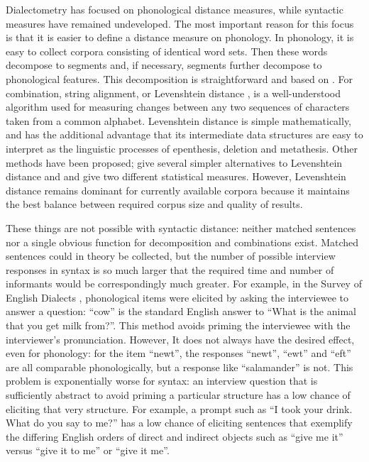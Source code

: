 Dialectometry has focused on phonological distance measures, while
syntactic measures have remained undeveloped. The most important
reason for this focus is that it is easier to define a distance
measure on phonology. In phonology, it is easy to collect corpora
consisting of identical word sets. Then these words decompose to segments and,
if necessary, segments further decompose to phonological
features. This decomposition is straightforward and based on
. For combination, string alignment, or Levenshtein
distance \cite{lev65}, is a well-understood algorithm used for
measuring changes between any two sequences of characters taken from a
common alphabet. Levenshtein distance is simple mathematically, and
has the additional advantage that its intermediate data structures are
easy to interpret as the linguistic processes of epenthesis, deletion and
metathesis. Other methods have been proposed; 
give several simpler alternatives to Levenshtein distance and
 and  give two different
statistical measures. However, Levenshtein distance remains dominant
for currently available corpora because it maintains the best balance
between required corpus size and quality of results.

These things are not possible with syntactic distance: neither matched
sentences nor a single obvious function for decomposition and
combinations exist. Matched sentences could in theory be collected, but the
number of possible interview responses in syntax is so much larger
that the required time and number of informants would be
correspondingly much greater. For example, in the Survey of English
Dialects \cite{orton63}, phonological items were elicited by asking
the interviewee to answer a question: ``cow'' is the standard English
answer to ``What is the animal that you get milk from?''. This method
avoids priming the interviewee with the interviewer's
pronunciation. However, It does not always have the desired effect,
even for phonology: for the item ``newt'', the responses ``newt'',
``ewt'' and ``eft'' are all comparable phonologically, but a response
like ``salamander'' is not. This problem is exponentially worse for
syntax: an interview question that is sufficiently abstract to avoid
priming a particular structure has a low chance of eliciting that very
structure. For example, a prompt such as ``I took your drink. What do
you say to me?'' has a low chance of eliciting sentences that
exemplify the differing English orders of direct and indirect objects
such as ``give me it'' versus ``give it to me'' or ``give it me''.

